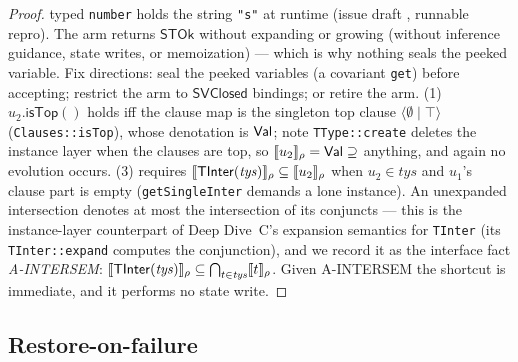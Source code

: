 \documentclass[11pt]{article}
\newcommand{\SVClosed}{\mathsf{SVClosed}}
\newcommand{\clause}[2]{\langle #1 \mid #2 \rangle}
\newcommand{\STOk}{\mathsf{STOk}}
\begin{document}
\begin{proof}
typed \texttt{number} holds the string \texttt{"s"} at runtime (issue
draft , runnable
repro). The arm returns $\STOk$ without expanding or growing
(without inference guidance, state writes, or memoization) --- which is why
nothing seals the peeked variable. Fix directions: seal the peeked
variables (a covariant \texttt{get}) before accepting; restrict the arm
to $\SVClosed$ bindings; or retire the arm.
(1) $u_2.\mathsf{isTop}()$ holds iff the clause map is the singleton top
clause $\clause{\emptyset}{\top}$ (\texttt{Clauses::isTop}), whose
denotation is $\mathsf{Val}$; note \texttt{TType::create} deletes the instance
layer when the clauses are top, so $\llbracket u_2 \rrbracket_\rho = \mathsf{Val} \supseteq$
anything, and again no evolution occurs.
(3) requires $\llbracket \mathsf{TInter}(\mathit{tys}) \rrbracket_\rho \subseteq
\llbracket u_2 \rrbracket_\rho$ when $u_2 \in \mathit{tys}$ and $u_1$'s clause part is
empty (\texttt{getSingleInter} demands a lone instance). An unexpanded
intersection denotes at most the intersection of its conjuncts ---
this is the instance-layer counterpart of Deep Dive~C's expansion
semantics for \texttt{TInter} (its \texttt{TInter::expand} computes the
conjunction), and we record it as the interface fact
\emph{A-INTERSEM}: $\llbracket \mathsf{TInter}(\mathit{tys}) \rrbracket_\rho \subseteq
\bigcap_{t \in \mathit{tys}} \llbracket t \rrbracket_\rho$. Given A-INTERSEM the shortcut
is immediate, and it performs no state write.
\end{proof}

\subsection{Restore-on-failure}
\label{sec:restore}
\end{document}
